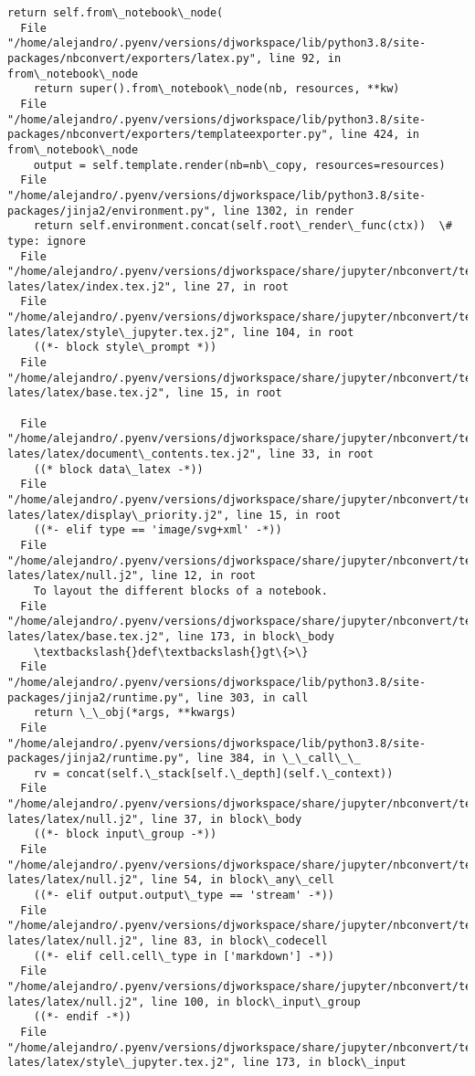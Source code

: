 \documentclass[11pt]{article}
\begin{document}
\begin{Verbatim}[commandchars=\\\{\}]
    return self.from\_notebook\_node(
  File "/home/alejandro/.pyenv/versions/djworkspace/lib/python3.8/site-
packages/nbconvert/exporters/latex.py", line 92, in from\_notebook\_node
    return super().from\_notebook\_node(nb, resources, **kw)
  File "/home/alejandro/.pyenv/versions/djworkspace/lib/python3.8/site-
packages/nbconvert/exporters/templateexporter.py", line 424, in
from\_notebook\_node
    output = self.template.render(nb=nb\_copy, resources=resources)
  File "/home/alejandro/.pyenv/versions/djworkspace/lib/python3.8/site-
packages/jinja2/environment.py", line 1302, in render
    return self.environment.concat(self.root\_render\_func(ctx))  \# type: ignore
  File "/home/alejandro/.pyenv/versions/djworkspace/share/jupyter/nbconvert/temp
lates/latex/index.tex.j2", line 27, in root
  File "/home/alejandro/.pyenv/versions/djworkspace/share/jupyter/nbconvert/temp
lates/latex/style\_jupyter.tex.j2", line 104, in root
    ((*- block style\_prompt *))
  File "/home/alejandro/.pyenv/versions/djworkspace/share/jupyter/nbconvert/temp
lates/latex/base.tex.j2", line 15, in root

  File "/home/alejandro/.pyenv/versions/djworkspace/share/jupyter/nbconvert/temp
lates/latex/document\_contents.tex.j2", line 33, in root
    ((* block data\_latex -*))
  File "/home/alejandro/.pyenv/versions/djworkspace/share/jupyter/nbconvert/temp
lates/latex/display\_priority.j2", line 15, in root
    ((*- elif type == 'image/svg+xml' -*))
  File "/home/alejandro/.pyenv/versions/djworkspace/share/jupyter/nbconvert/temp
lates/latex/null.j2", line 12, in root
    To layout the different blocks of a notebook.
  File "/home/alejandro/.pyenv/versions/djworkspace/share/jupyter/nbconvert/temp
lates/latex/base.tex.j2", line 173, in block\_body
    \textbackslash{}def\textbackslash{}gt\{>\}
  File "/home/alejandro/.pyenv/versions/djworkspace/lib/python3.8/site-
packages/jinja2/runtime.py", line 303, in call
    return \_\_obj(*args, **kwargs)
  File "/home/alejandro/.pyenv/versions/djworkspace/lib/python3.8/site-
packages/jinja2/runtime.py", line 384, in \_\_call\_\_
    rv = concat(self.\_stack[self.\_depth](self.\_context))
  File "/home/alejandro/.pyenv/versions/djworkspace/share/jupyter/nbconvert/temp
lates/latex/null.j2", line 37, in block\_body
    ((*- block input\_group -*))
  File "/home/alejandro/.pyenv/versions/djworkspace/share/jupyter/nbconvert/temp
lates/latex/null.j2", line 54, in block\_any\_cell
    ((*- elif output.output\_type == 'stream' -*))
  File "/home/alejandro/.pyenv/versions/djworkspace/share/jupyter/nbconvert/temp
lates/latex/null.j2", line 83, in block\_codecell
    ((*- elif cell.cell\_type in ['markdown'] -*))
  File "/home/alejandro/.pyenv/versions/djworkspace/share/jupyter/nbconvert/temp
lates/latex/null.j2", line 100, in block\_input\_group
    ((*- endif -*))
  File "/home/alejandro/.pyenv/versions/djworkspace/share/jupyter/nbconvert/temp
lates/latex/style\_jupyter.tex.j2", line 173, in block\_input


\end{Verbatim}
\end{document}
